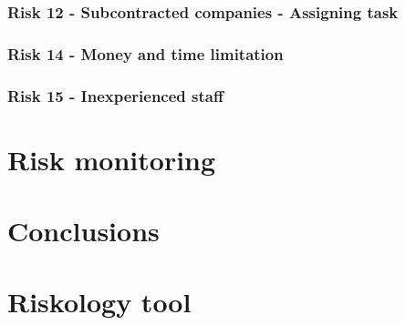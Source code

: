 \documentclass[11pt]{report}
\begin{document}
\subsection{Risk 12 - Subcontracted companies - Assigning task}
\subsection{Risk 14 - Money and time limitation}
\subsection{Risk 15 - Inexperienced staff}




\chapter{Risk monitoring}


\chapter{Conclusions}

\appendix

\chapter{Riskology tool}
\end{document}
